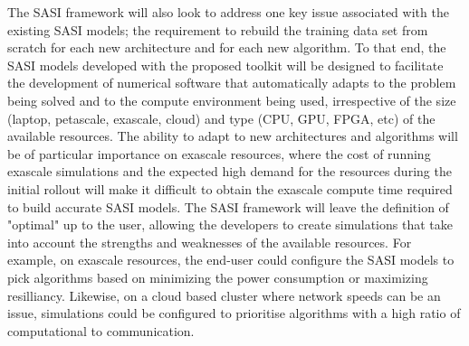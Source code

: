 The SASI framework will also look to address one key issue associated with the existing SASI models; the requirement to rebuild the training data set from scratch for each new architecture and for each new algorithm. To that end, the SASI models developed with the proposed toolkit will be designed to facilitate the development of numerical software that automatically adapts to the problem being solved and to the compute environment being used, irrespective of the size (laptop, petascale, exascale, cloud) and type (CPU, GPU, FPGA, etc) of the available resources. The ability to adapt to new architectures and algorithms will be of particular importance on exascale resources, where the cost of running exascale simulations and the expected high demand for the resources during the initial rollout will make it difficult to obtain the exascale compute time required to build accurate SASI models. The SASI framework will leave the definition of "optimal" up to the user, allowing the developers to create simulations that take into account the strengths and weaknesses of the available resources. For example, on exascale resources, the end-user could configure the SASI models to pick algorithms based on minimizing the power consumption or maximizing resilliancy. Likewise, on a cloud based cluster where network speeds can be an issue, simulations could be configured to prioritise algorithms with a high ratio of computational to communication.  
